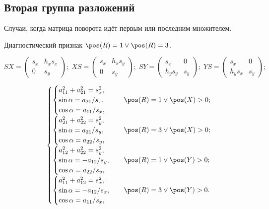 \subsection{Вторая группа разложений}

Случаи, когда матрица поворота идёт первым или последним множителем.

Диагностический признак $\pos(R)=1 \vee \pos(R)=3 $.

$$
SX = \begin{pmatrix}s_x & h_xs_x \\ 0 & s_y\end{pmatrix};\;
XS = \begin{pmatrix}s_x & h_xs_y \\ 0 & s_y\end{pmatrix};\;
SY = \begin{pmatrix}s_x & 0 \\ h_ys_y & s_y\end{pmatrix};\;
YS = \begin{pmatrix}s_x & 0 \\ h_ys_x & s_y\end{pmatrix};
$$

$$
\begin{cases}
	\begin{cases}
		a_{11}^2 + a_{21}^2 = s_x^2, \\
		\sin\alpha = a_{21}/s_x,\\
		\cos\alpha = a_{11}/s_x,
	\end{cases} & \pos(R)=1 \vee \pos(X)>0;\\
	\begin{cases}
		a_{21}^2 + a_{22}^2 = s_y^2, \\
		\sin\alpha = a_{21}/s_y,\\
		\cos\alpha = a_{22}/s_y,
	\end{cases} & \pos(R)=3 \vee \pos(X)>0;\\
	\begin{cases}
		a_{12}^2 + a_{22}^2 = s_y^2,\\
		\sin\alpha = -a_{12}/s_y,\\
		\cos\alpha = a_{22}/s_y,
	\end{cases} & \pos(R)=1 \vee \pos(Y)>0;\\
	\begin{cases}
		a_{11}^2 + a_{12}^2 = s_x^2,\\
		\sin\alpha = -a_{12}/s_x,\\
		\cos\alpha = a_{11}/s_x,
	\end{cases} & \pos(R)=3 \vee \pos(Y)>0.\\
\end{cases}
$$

